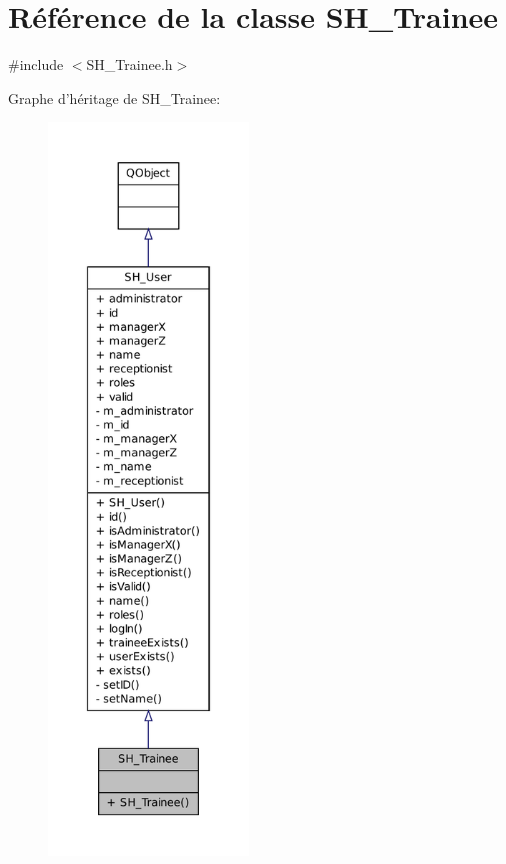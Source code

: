 \hypertarget{classSH__Trainee}{\section{Référence de la classe S\-H\-\_\-\-Trainee}
\label{classSH__Trainee}
}


{\ttfamily \#include $<$S\-H\-\_\-\-Trainee.\-h$>$}



Graphe d'héritage de S\-H\-\_\-\-Trainee\-:
\nopagebreak
\begin{figure}[H]
\begin{center}
\leavevmode
\includegraphics[height=550pt]{classSH__Trainee__inherit__graph}
\end{center}
\end{figure}


